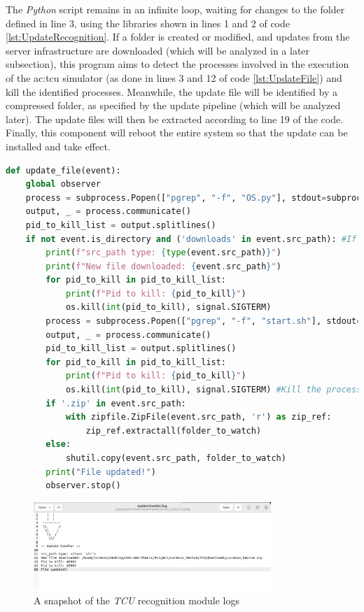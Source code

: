 The \textit{Python} script remains in an infinite loop, waiting for changes to the folder defined in line 3, using the libraries shown in lines 1 and 2 of code \ref{lst:UpdateRecognition}.
If a folder is created or modified, and updates from the server infrastructure are downloaded (which will be analyzed in a later subsection), this program aims to detect the processes involved in the execution of the \gls{ac:tcu} simulator (as done in lines 3 and 12 of code \ref{lst:UpdateFile}) and kill the identified processes. Meanwhile, the update file will be identified by a compressed folder, as specified by the update pipeline (which will be analyzed later). The update files will then be extracted according to line 19 of the code. Finally, this component will reboot the entire system so that the update can be installed and take effect.
\begin{lstlisting}[language=Python, caption={Code for performing actions when the designated download folder is changed}, label=lst:UpdateFile]
def update_file(event):
    global observer
    process = subprocess.Popen(["pgrep", "-f", "OS.py"], stdout=subprocess.PIPE, text=True)
    output, _ = process.communicate()
    pid_to_kill_list = output.splitlines()
    if not event.is_directory and ('downloads' in event.src_path): #If the new item is a directory
        print(f"src_path type: {type(event.src_path)}")
        print(f"New file downloaded: {event.src_path}")
        for pid_to_kill in pid_to_kill_list:
            print(f"Pid to kill: {pid_to_kill}")
            os.kill(int(pid_to_kill), signal.SIGTERM)    
        process = subprocess.Popen(["pgrep", "-f", "start.sh"], stdout=subprocess.PIPE, text=True)
        output, _ = process.communicate()
        pid_to_kill_list = output.splitlines()
        for pid_to_kill in pid_to_kill_list:
            print(f"Pid to kill: {pid_to_kill}")
            os.kill(int(pid_to_kill), signal.SIGTERM) #Kill the process
        if '.zip' in event.src_path:
            with zipfile.ZipFile(event.src_path, 'r') as zip_ref:
                zip_ref.extractall(folder_to_watch)
        else:
            shutil.copy(event.src_path, folder_to_watch)          
        print("File updated!")
        observer.stop()
\end{lstlisting}

\begin{figure}[h]  %
    \centering
    \includegraphics[width=0.8\textwidth]{images/watchdog_log.png}  %
    \caption{A snapshot of the \textit{TCU} recognition module logs}
    \label{fig:Watchdog_log}
\end{figure}

